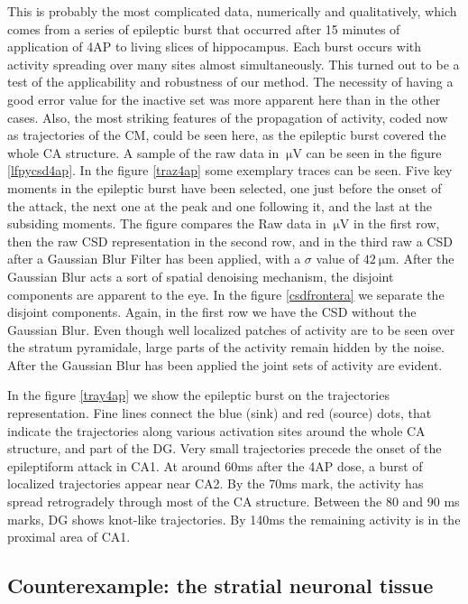 \documentclass[utf8]{frontiersSCNS}
\newcommand{\mum}[1]{\SI{#1}{\micro\metre}}
\newcommand{\muV}[1]{\SI{#1}{\micro\volt}}
\begin{document}
This is probably the most complicated data, 
numerically and qualitatively, which comes from a series of epileptic burst
that occurred after 15 minutes of application of 4AP to living slices of
hippocampus. Each burst occurs with activity spreading over many sites almost
simultaneously. This turned out to be a test of the applicability and
robustness of our method.
The necessity of having a good error value for the inactive set was more apparent here
than in the other cases. Also, the most striking features of the propagation of activity,
coded now as trajectories of the CM, could be seen here, as the epileptic burst covered the whole
CA structure. A sample of the raw data in $\muV{}$ can be seen in the figure \ref{lfpycsd4ap}. In the figure \ref{traz4ap} some exemplary traces
can be seen.
Five key moments in the epileptic burst have been selected, one just before the onset of the attack, the next one at the peak and one following it, and the last at the subsiding moments. The figure compares the Raw data
in $\muV{}$ in the first row, then the raw CSD representation in the second row, and
in the third raw a CSD after a Gaussian Blur Filter has been applied,
with a $\sigma$ value of $ \mum{42}$. After the Gaussian Blur acts a sort of
spatial denoising mechanism, the disjoint components are apparent to the eye.
In the figure \ref{csdfrontera} we separate the disjoint
components. Again, in the first row we have the CSD without the Gaussian Blur.
Even though well localized patches of activity are to be seen over the
stratum pyramidale, large parts of the activity remain hidden by the noise.
After the Gaussian Blur has been applied the joint sets of activity are evident. 

In the figure \ref{tray4ap} we show the epileptic burst on the trajectories representation.
Fine lines
connect the blue (sink) and red (source) dots, that indicate the trajectories
along various activation
sites around the whole CA structure, and part of the DG. Very small trajectories precede
the onset of the epileptiform attack in CA1. At around 60ms after the 4AP dose, a burst
of localized trajectories appear near CA2. By the 70ms mark, the activity has spread
retrogradely through most of the CA structure. Between the 80 and 90 ms marks,
DG shows knot-like trajectories. By 140ms the remaining activity is in the proximal
area of CA1.




\subsection{Counterexample: the stratial neuronal tissue}
\end{document}
